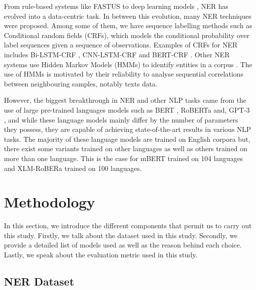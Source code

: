 \documentclass{article}
\begin{document}
From rule-based systems like FASTUS \cite{appelt-etal-1995-sri} to deep learning models \cite{DBLP:journals/corr/abs-1812-09449}, NER has evolved into a data-centric task. In between this evolution, many NER techniques were proposed. Among some of them, we have sequence labelling methods such as Conditional random fields (CRFs), which models the conditional probability over label sequences given a sequence of observations. Examples of CRFs for NER includes Bi-LSTM-CRF \cite{DBLP:journals/corr/HuangXY15}, CNN-LSTM-CRF \cite{DBLP:journals/corr/abs-1905-01964} and BERT-CRF \cite{DBLP:journals/corr/abs-1909-10649}. Other NER systems use Hidden Markov Models (HMMs) to identify entities in a corpus \cite{10.1007/978-3-540-77046-6_67}. The use of HMMs is motivated by their reliability to analyse sequential correlations between neighbouring samples, notably texts data.

However, the biggest breakthrough in NER and other NLP tasks came from the use of large pre-trained languages models such as BERT  \cite{DBLP:journals/corr/abs-1810-04805}, RoBERTa \cite{DBLP:journals/corr/abs-1907-11692} and, GPT-3 \cite{DBLP:journals/corr/abs-2005-14165}, and while these language models mainly differ by the number of parameters they possess, they are capable of achieving state-of-the-art results in various NLP tasks. The majority of these language models are trained on English corpora but, there exist some variants trained on other languages \cite{DBLP:journals/corr/abs-1911-03894, DBLP:journals/corr/abs-2012-02110, CaneteCFP2020} as well as others trained on more than one language. This is the case for mBERT \cite{DBLP:journals/corr/abs-1911-03310} trained on 104 languages and XLM-RoBERa \cite{DBLP:journals/corr/abs-1901-07291} trained on 100 languages.

\section{Methodology}
\label{sec:met}

In this section, we introduce the different components that permit us to carry out this study. Firstly, we talk about the dataset used in this study. Secondly, we provide a detailed list of models used as well as the reason behind each choice. Lastly, we speak about the evaluation metric used in this study.

\subsection{NER Dataset}
\end{document}
